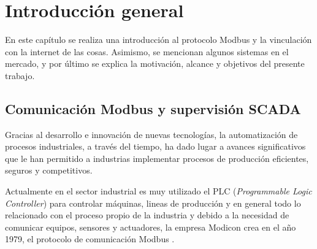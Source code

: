 
\chapter{Introducción general} %

\label{Chapter1} %
\label{IntroGeneral}


\newcommand{\keyword}[1]{\textbf{#1}}
\newcommand{\tabhead}[1]{\textbf{#1}}
\newcommand{\code}[1]{\texttt{#1}}
\newcommand{\file}[1]{\texttt{\bfseries#1}}
\newcommand{\option}[1]{\texttt{\itshape#1}}
\newcommand{\grados}{$^{\circ}$}

En este capítulo se realiza una introducción al protocolo Modbus y la vinculación con la internet de las cosas. Asimismo, se mencionan algunos sistemas en el mercado, y por último se explica la motivación, alcance y objetivos del presente trabajo.




\section{Comunicación Modbus y supervisión SCADA}

Gracias al desarrollo e innovación de nuevas tecnologías, la automatización de procesos industriales, a través del tiempo, ha dado lugar a avances significativos que le han permitido a industrias implementar procesos de producción eficientes, seguros y competitivos.

Actualmente en el sector industrial es muy utilizado el PLC (\textit{Programmable Logic Controller}) \citep{WEBSITE:1} para controlar máquinas, lineas de producción y en general todo lo relacionado con el proceso propio de la industria y debido a la necesidad de comunicar equipos, sensores y actuadores, la empresa Modicon crea en el año 1979, el protocolo de comunicación Modbus \citep{WEBSITE:2}. 

